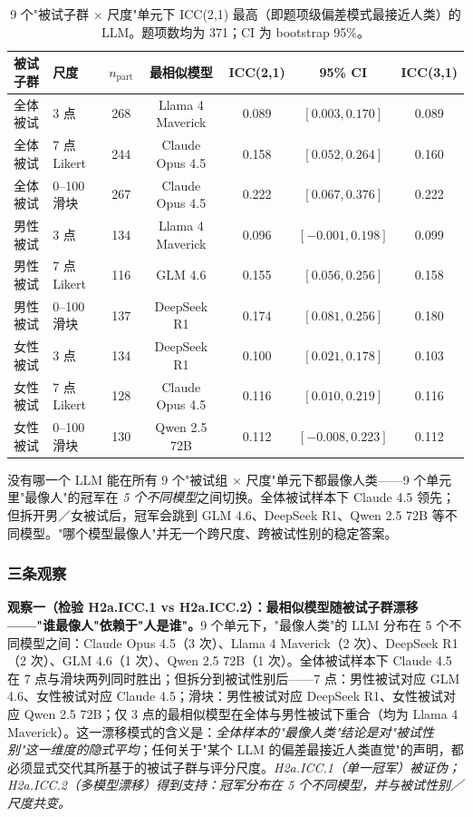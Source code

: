 \documentclass[UTF8,12pt]{ctexart}
\begin{document}
\begin{table}[htbp]
    \centering
    \caption{9 个"被试子群 $\times$ 尺度"单元下 ICC(2,1) 最高（即题项级偏差模式最接近人类）的 LLM。题项数均为 371；CI 为 bootstrap 95\%。}
    \label{tab:2a-icc-top1}
    \footnotesize
    \setlength{\tabcolsep}{5pt}
    \begin{tabular}{llccccc}
        \toprule
        被试子群 & 尺度 & $n_{\text{part}}$ & 最相似模型 & ICC(2,1) & 95\% CI & ICC(3,1) \\
        \midrule
        全体被试 & 3 点        & 268 & Llama 4 Maverick & 0.089 & $[0.003, 0.170]$   & 0.089 \\
        全体被试 & 7 点 Likert & 244 & Claude Opus 4.5  & 0.158 & $[0.052, 0.264]$   & 0.160 \\
        全体被试 & 0--100 滑块 & 267 & Claude Opus 4.5  & 0.222 & $[0.067, 0.376]$   & 0.222 \\
        男性被试 & 3 点        & 134 & Llama 4 Maverick & 0.096 & $[-0.001, 0.198]$  & 0.099 \\
        男性被试 & 7 点 Likert & 116 & GLM 4.6          & 0.155 & $[0.056, 0.256]$   & 0.158 \\
        男性被试 & 0--100 滑块 & 137 & DeepSeek R1      & 0.174 & $[0.081, 0.256]$   & 0.180 \\
        女性被试 & 3 点        & 134 & DeepSeek R1      & 0.100 & $[0.021, 0.178]$   & 0.103 \\
        女性被试 & 7 点 Likert & 128 & Claude Opus 4.5  & 0.116 & $[0.010, 0.219]$   & 0.116 \\
        女性被试 & 0--100 滑块 & 130 & Qwen 2.5 72B     & 0.112 & $[-0.008, 0.223]$  & 0.112 \\
        \bottomrule
    \end{tabular}
\end{table}

没有哪一个 LLM 能在所有 9 个"被试组 $\times$ 尺度"单元下都最像人类——9 个单元里"最像人"的冠军在 \emph{5 个不同模型}之间切换。全体被试样本下 Claude 4.5 领先；但拆开男／女被试后，冠军会跳到 GLM 4.6、DeepSeek R1、Qwen 2.5 72B 等不同模型。"哪个模型最像人"并无一个跨尺度、跨被试性别的稳定答案。

\subsubsection{三条观察}

\textbf{观察一（检验 H2a.ICC.1 vs H2a.ICC.2）：最相似模型随被试子群漂移——"谁最像人"依赖于"人是谁"。}9 个单元下，"最像人类"的 LLM 分布在 5 个不同模型之间：Claude Opus 4.5（3 次）、Llama 4 Maverick（2 次）、DeepSeek R1（2 次）、GLM 4.6（1 次）、Qwen 2.5 72B（1 次）。全体被试样本下 Claude 4.5 在 7 点与滑块两列同时胜出；但拆分到被试性别后——7 点：男性被试对应 GLM 4.6、女性被试对应 Claude 4.5；滑块：男性被试对应 DeepSeek R1、女性被试对应 Qwen 2.5 72B；仅 3 点的最相似模型在全体与男性被试下重合（均为 Llama 4 Maverick）。这一漂移模式的含义是：\emph{全体样本的"最像人类"结论是对"被试性别"这一维度的隐式平均}；任何关于"某个 LLM 的偏差最接近人类直觉"的声明，都必须显式交代其所基于的被试子群与评分尺度。\emph{H2a.ICC.1（单一冠军）被证伪；H2a.ICC.2（多模型漂移）得到支持：冠军分布在 5 个不同模型，并与被试性别／尺度共变。}
\end{document}
